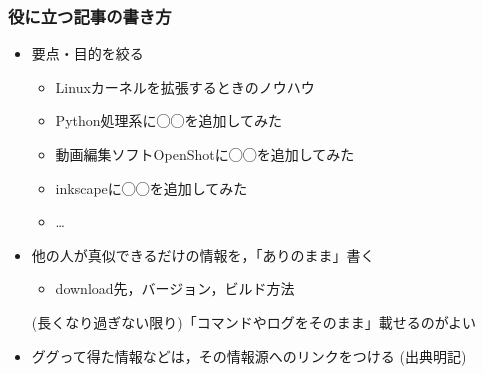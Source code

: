 \documentclass[12pt,dvipdfmx]{beamer}
\begin{document}
\begin{frame}
\frametitle{役に立つ記事の書き方}

\begin{itemize}
\item 要点・目的を絞る
  \begin{itemize}
    \iffalse    
  \item Libreoffice Calcの関数名補完機能を作ってみた
  \item inkscapeに中線機能入れてみた
  \item Pythonに ++ 入れてみた
    \fi
    \iffalse
  \item jsにパイプラインオペレータ入れてみた
  \item Chromeにあやしい履歴の非表示機能入れてみた
  \item fishにwaitコマンド入れてみた
  \item \ldots
    \fi
    \iffalse
  \item CodiMDのPDF出力機能を数式に対応させてみた
  \item MuseScoreのキーボードショートカットを◯◯してみた
  \item VSCodeのread onlyモードをイケてる感じにしてみた
  \item inkscapeで「全レイヤに表示されるオブジェクト」を追加してみた
  \item Remminaで逆方向接続(サーバ$\rightarrow$クライアント)できるようにしてみた
  \item VimでJupyterみたいなことができるようにしてみた
  \item \ldots
    \fi
  \item Linuxカーネルを拡張するときのノウハウ
  \item Python処理系に◯◯を追加してみた
  \item 動画編集ソフトOpenShotに◯◯を追加してみた
  \item inkscapeに◯◯を追加してみた
  \item \ldots
  \end{itemize}

\item 他の人が真似できるだけの情報を，「ありのまま」書く
  \begin{itemize}
  \item download先，バージョン，ビルド方法
  \end{itemize}
(長くなり過ぎない限り)「コマンドやログをそのまま」載せるのがよい

\item ググって得た情報などは，その情報源へのリンクをつける
(出典明記)
\end{itemize}
\end{frame}
\end{document}

